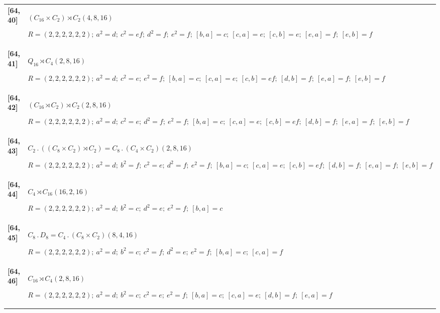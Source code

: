 \documentclass[UTF8,fontset=fandol,11pt,a4paper]{ctexart}
\begin{document}
\begin{longtable}{@{}p{17mm}>{\raggedright\arraybackslash}p{141mm}@{}}
\textbf{[64,40]} & $(C_{16}\times C_{2})\rtimes C_{2}$\quad $(4,8,16)$\par\(R=(2,2,2,2,2,2);\allowbreak\ a^{2}=d;\allowbreak\ c^{2}=ef;\allowbreak\ d^{2}=f;\allowbreak\ e^{2}=f;\allowbreak\ [b,a]=c;\allowbreak\ [c,a]=e;\allowbreak\ [c,b]=e;\allowbreak\ [e,a]=f;\allowbreak\ [e,b]=f\)\\[3pt]

\textbf{[64,41]} & $Q_{16}\rtimes C_{4}$\quad $(2,8,16)$\par\(R=(2,2,2,2,2,2);\allowbreak\ a^{2}=d;\allowbreak\ c^{2}=e;\allowbreak\ e^{2}=f;\allowbreak\ [b,a]=c;\allowbreak\ [c,a]=e;\allowbreak\ [c,b]=ef;\allowbreak\ [d,b]=f;\allowbreak\ [e,a]=f;\allowbreak\ [e,b]=f\)\\[3pt]

\textbf{[64,42]} & $(C_{16}\rtimes C_{2})\rtimes C_{2}$\quad $(2,8,16)$\par\(R=(2,2,2,2,2,2);\allowbreak\ a^{2}=d;\allowbreak\ c^{2}=e;\allowbreak\ d^{2}=f;\allowbreak\ e^{2}=f;\allowbreak\ [b,a]=c;\allowbreak\ [c,a]=e;\allowbreak\ [c,b]=ef;\allowbreak\ [d,b]=f;\allowbreak\ [e,a]=f;\allowbreak\ [e,b]=f\)\\[3pt]

\textbf{[64,43]} & $C_{2}\mathbin{.} ((C_{8}\times C_{2})\rtimes C_{2}) = C_{8}\mathbin{.} (C_{4}\times C_{2})$\quad $(2,8,16)$\par\(R=(2,2,2,2,2,2);\allowbreak\ a^{2}=d;\allowbreak\ b^{2}=f;\allowbreak\ c^{2}=e;\allowbreak\ d^{2}=f;\allowbreak\ e^{2}=f;\allowbreak\ [b,a]=c;\allowbreak\ [c,a]=e;\allowbreak\ [c,b]=ef;\allowbreak\ [d,b]=f;\allowbreak\ [e,a]=f;\allowbreak\ [e,b]=f\)\\[3pt]

\textbf{[64,44]} & $C_{4}\rtimes C_{16}$\quad $(16,2,16)$\par\(R=(2,2,2,2,2,2);\allowbreak\ a^{2}=d;\allowbreak\ b^{2}=c;\allowbreak\ d^{2}=e;\allowbreak\ e^{2}=f;\allowbreak\ [b,a]=c\)\\[3pt]

\textbf{[64,45]} & $C_{8}\mathbin{.} D_{8} = C_{4}\mathbin{.} (C_{8}\times C_{2})$\quad $(8,4,16)$\par\(R=(2,2,2,2,2,2);\allowbreak\ a^{2}=d;\allowbreak\ b^{2}=c;\allowbreak\ c^{2}=f;\allowbreak\ d^{2}=e;\allowbreak\ e^{2}=f;\allowbreak\ [b,a]=c;\allowbreak\ [c,a]=f\)\\[3pt]

\textbf{[64,46]} & $C_{16}\rtimes C_{4}$\quad $(2,8,16)$\par\(R=(2,2,2,2,2,2);\allowbreak\ a^{2}=d;\allowbreak\ b^{2}=c;\allowbreak\ c^{2}=e;\allowbreak\ e^{2}=f;\allowbreak\ [b,a]=c;\allowbreak\ [c,a]=e;\allowbreak\ [d,b]=f;\allowbreak\ [e,a]=f\)\\[3pt]


\end{longtable}
\end{document}
